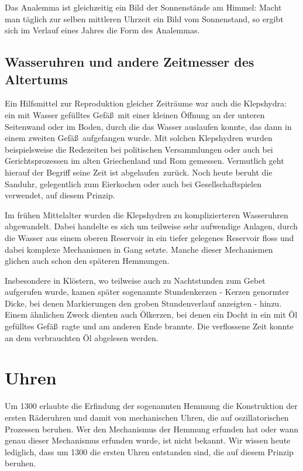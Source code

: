 Das Analemma ist gleichzeitig ein Bild der Sonnenst\"ande am Himmel: Macht man t\"aglich
zur selben mittleren Uhrzeit ein Bild vom Sonnenstand, so ergibt sich im Verlauf eines Jahres die Form
des Analemmas.  

\subsection{Wasseruhren und andere Zeitmesser des Altertums}

Ein Hilfsmittel zur Reproduktion gleicher Zeitr\"aume war auch die Klepshydra: 
ein mit Wasser
gef\"ulltes Gef\"a\ss\ mit einer kleinen \"Offnung an der unteren Seitenwand oder im Boden, 
durch die das Wasser auslaufen
konnte, das dann in einem zweiten Gef\"a\ss\ aufgefangen wurde. Mit solchen Klepshydren wurden
beispielsweise die Redezeiten bei politischen Versammlungen oder auch bei Gerichtsprozessen im alten 
Griechenland und Rom
gemessen. Vermutlich geht hierauf der Begriff \glqq seine Zeit ist abgelaufen\grqq\ zur\"uck. Noch heute
beruht die Sanduhr, gelegentlich zum Eierkochen oder auch bei Gesellschaftspielen verwendet, 
auf diesem Prinzip.

Im fr\"uhen Mittelalter wurden die Klepshydren zu komplizierteren Wasseruhren abgewandelt. 
Dabei handelte es sich um teilweise sehr aufwendige Anlagen, durch die Wasser aus einem
oberen Reservoir in ein tiefer gelegenes Reservoir floss und dabei komplexe Mechanismen
in Gang setzte. Manche dieser Mechanismen glichen auch schon den sp\"ateren Hemmungen.

Insbesondere in Kl\"ostern, wo teilweise auch zu Nachtstunden zum Gebet aufgerufen wurde, kamen sp\"ater
sogenannte 
Stundenkerzen - Kerzen genormter Dicke, bei denen Markierungen den groben
Stundenverlauf anzeigten - hinzu. Einem \"ahnlichen Zweck dienten auch \"Olkerzen, bei denen
ein Docht in ein mit \"Ol gef\"ulltes Gef\"a\ss\ ragte und am anderen Ende brannte. Die
verflossene Zeit konnte an dem verbrauchten \"Ol abgelesen werden.

\section{Uhren}

Um 1300 erlaubte die Erfindung der sogenannten Hemmung die Konstruktion der
ersten R\"aderuhren und damit von mechanischen Uhren, die auf oszillatorischen Prozessen beruhen. 
Wer den Mechanismus der Hemmung erfunden hat oder wann genau dieser
Mechanismus erfunden wurde, ist nicht bekannt. Wir wissen heute lediglich, dass um 1300 die
ersten Uhren entstanden sind, die auf diesem Prinzip beruhen. 

